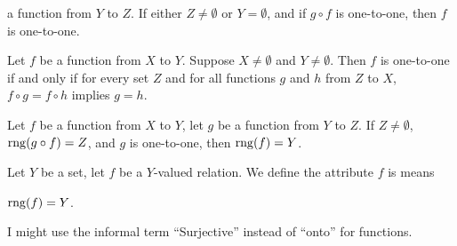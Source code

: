 \documentclass{article}
\begin{document}
\begin{thm}
  a function from $Y$ to $Z$. If either $Z\neq\emptyset$ or $Y=\emptyset$,
  and if $g\circ f$ is one-to-one, then $f$ is one-to-one.
\item\label{funct2:21} Let $f$ be a function from $X$ to $Y$. Suppose
  $X\neq\emptyset$ and $Y\neq\emptyset$.
  Then $f$ is one-to-one if and only if for every set $Z$ and for all
  functions $g$ and $h$ from $Z$ to $X$, $f\circ g=f\circ h$ implies $g=h$.
\item\label{funct2:22} Let $f$ be a function from $X$ to $Y$,
  let $g$ be a function from $Y$ to $Z$. If $Z\neq\emptyset$,
  $\operatorname{rng}(g\circ f)=Z$, and $g$ is one-to-one, then $\operatorname{rng}(f)=Y$.
\end{thm}

\begin{definition}
Let $Y$ be a set, let $f$ be a $Y$-valued relation.
We define the attribute $f$ is  means
\begin{defn}
\item $\operatorname{rng}(f)=Y$.
\end{defn}
\end{definition}

\begin{remark}
I might use the informal term ``Surjective''%
instead of ``onto'' for functions.
\end{remark}
\end{document}
